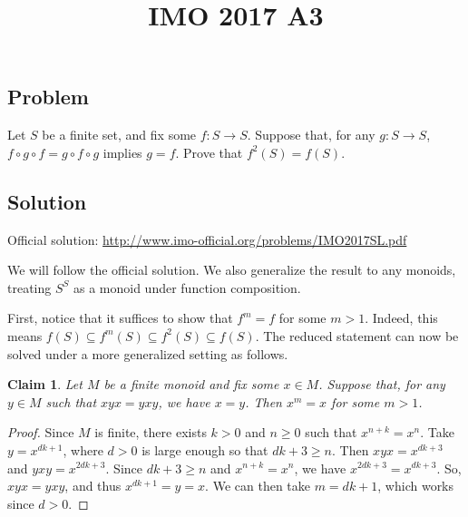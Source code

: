 \documentclass{article}
\title{IMO 2017 A3}
\author{}
\date{}
\newtheorem*{claim}{Claim}
\begin{document}
\maketitle



\subsection*{Problem}

Let $S$ be a finite set, and fix some $f : S \to S$.
Suppose that, for any $g : S \to S$, $f \circ g \circ f = g \circ f \circ g$ implies $g = f$.
Prove that $f^2(S) = f(S)$.



\subsection*{Solution}

Official solution: \url{http://www.imo-official.org/problems/IMO2017SL.pdf}

We will follow the official solution.
We also generalize the result to any monoids, treating $S^S$ as a monoid under function composition.

First, notice that it suffices to show that $f^m = f$ for some $m > 1$.
Indeed, this means $f(S) \subseteq f^m(S) \subseteq f^2(S) \subseteq f(S)$.
The reduced statement can now be solved under a more generalized setting as follows.

\begin{claim}
Let $M$ be a finite monoid and fix some $x \in M$.
Suppose that, for any $y \in M$ such that $xyx = yxy$, we have $x = y$.
Then $x^m = x$ for some $m > 1$.
\end{claim}
\begin{proof}
Since $M$ is finite, there exists $k > 0$ and $n \geq 0$ such that $x^{n + k} = x^n$.
Take $y = x^{dk + 1}$, where $d > 0$ is large enough so that $dk + 3 \geq n$.
Then $xyx = x^{dk + 3}$ and $yxy = x^{2dk + 3}$.
Since $dk + 3 \geq n$ and $x^{n + k} = x^n$, we have $x^{2dk + 3} = x^{dk + 3}$.
So, $xyx = yxy$, and thus $x^{dk + 1} = y = x$.
We can then take $m = dk + 1$, which works since $d > 0$.
\end{proof}
\end{document}
